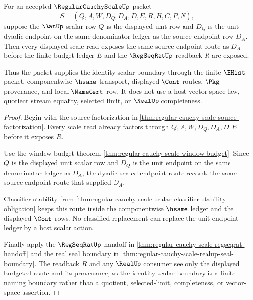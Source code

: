 \begin{theorem}
\label{thm:regular-cauchy-scale-unit-scalar-boundary}
For an accepted $\RegularCauchyScaleUp$ packet
$$
S=(Q,A,W,D_Q,D_A,D,E,R,H,C,P,N),
$$
suppose the $\RatUp$ scalar row $Q$ is the displayed unit row and $D_Q$ is the unit dyadic endpoint on the same denominator ledger as the source endpoint row $D_A$. Then every displayed scale read exposes the same source endpoint route as $D_A$ before the finite budget ledger $E$ and the $\RegSeqRatUp$ readback $R$ are exposed.

Thus the packet supplies the identity-scalar boundary through the finite $\BHist$ packet, componentwise $\hsame$ transport, displayed $\Cont$ routes, $\Pkg$ provenance, and local $\NameCert$ row. It does not use a host vector-space law, quotient stream equality, selected limit, or $\RealUp$ completeness.
\end{theorem}
\begin{proof}
Begin with the source factorization in \autoref{thm:regular-cauchy-scale-source-factorization}. Every scale read already factors through $Q,A,W,D_Q,D_A,D,E$ before it exposes $R$.

Use the window budget theorem \autoref{thm:regular-cauchy-scale-window-budget}. Since $Q$ is the displayed unit scalar row and $D_Q$ is the unit endpoint on the same denominator ledger as $D_A$, the dyadic scaled endpoint route records the same source endpoint route that supplied $D_A$.

Classifier stability from \autoref{thm:regular-cauchy-scale-scalar-classifier-stability-obligation} keeps this route inside the componentwise $\hsame$ ledger and the displayed $\Cont$ rows. No classified replacement can replace the unit endpoint ledger by a host scalar action.

Finally apply the $\RegSeqRatUp$ handoff in \autoref{thm:regular-cauchy-scale-regseqrat-handoff} and the real seal boundary in \autoref{thm:regular-cauchy-scale-realup-seal-boundary}. The readback $R$ and any $\RealUp$ consumer see only the displayed budgeted route and its provenance, so the identity-scalar boundary is a finite naming boundary rather than a quotient, selected-limit, completeness, or vector-space assertion.
\end{proof}

